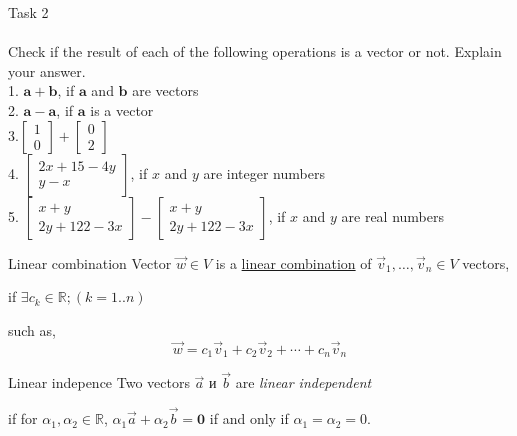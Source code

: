 \documentclass[aspectratio=169,notes]{beamer}
\begin{document}
\begin{frame}[t]{Task 2}
    \framesubtitle{}
    Check if the result of each of the following operations is a vector or not. Explain your answer. \\
    1. $\mathbf{a} + \mathbf{b}$, if $\mathbf{a}$ and $\mathbf{b}$ are vectors \\
    2. $\mathbf{a} - \mathbf{a}$, if $\mathbf{a}$ is a vector \\
    3.$\begin{bmatrix}
            1 \\
            0
        \end{bmatrix}
        +
        \begin{bmatrix}
            0 \\
            2
        \end{bmatrix}$ \\
    4. $\begin{bmatrix}
            2x + 15 - 4y \\
            y - x
        \end{bmatrix}$, if $x$ and $y$ are integer numbers \\
    5. $\begin{bmatrix}
            x + y \\
            2y + 122 - 3x
        \end{bmatrix} -
        \begin{bmatrix}
            x + y \\
            2y + 122 - 3x
        \end{bmatrix}$, if $x$ and $y$ are real numbers
\end{frame}

\begin{frame}{Linear combination}
    Vector $\vec{w}\in V$ is a \underline{linear combination} of $\vec{v}_1, \ldots, \vec{v}_n \in V$ vectors,

    if $\exists c_k\in \mathbb{R}; (k=1..n)$

    such as,
    \[ \vec{w} = c_1 \vec{v}_1 + c_2 \vec{v}_2 + \cdots + c_n \vec{v}_n \]

\end{frame}

\begin{frame}{Linear indepence}
    Two vectors  $\vec{a}$ и $\vec{b}$ are \emph{linear independent}

    if for $\alpha_1, \alpha_2\in \mathbb{R}$, $\alpha_1\vec{a} + \alpha_2\vec{b} = \mathbf{0}$ if and only if $\alpha_1 = \alpha_2 = 0$.

\end{frame}
\end{document}

